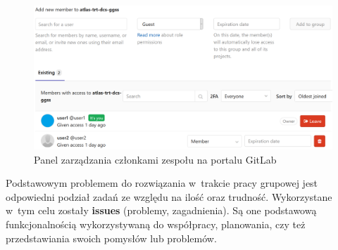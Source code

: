 \begin{figure}[H]
\centering
\includegraphics[width=\textwidth]{res/png/memberManagementPanel}
\caption{Panel zarządzania członkami zespołu na portalu GitLab}
\label{fig:memMan}
\end{figure}


Podstawowym problemem do rozwiązania w~trakcie pracy grupowej jest odpowiedni podział zadań ze względu na ilość oraz trudność. Wykorzystane w~tym celu zostały \textbf{issues} (problemy, zagadnienia). Są one podstawową funkcjonalnością wykorzystywaną do współpracy, planowania, czy też przedstawiania swoich pomysłów lub problemów.

